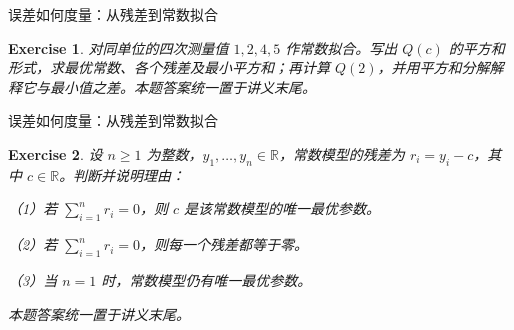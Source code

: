 \documentclass[aspectratio=169,10pt,fontset=fandol]{ctexbeamer}
\newtheorem{exercise}{Exercise}
\begin{document}
\begin{frame}[t,fragile]{误差如何度量：从残差到常数拟合}
\normalsize
{\normalsize
\begin{exercise}
\label{mathagent:exercise:79e91357ee05b8b9aa4c657d553157f1ef411624d282c3f2337dd0e01453ce2d}
对同单位的四次测量值 $1,2,4,5$ 作常数拟合。写出 $Q(c)$ 的平方和形式，求最优常数、各个残差及最小平方和；再计算 $Q(2)$，并用平方和分解解释它与最小值之差。本题答案统一置于讲义末尾。
\end{exercise}
}
\end{frame}
\begin{frame}[t,fragile]{误差如何度量：从残差到常数拟合}
\normalsize
{\normalsize
\begin{exercise}
\label{mathagent:exercise:9e7dbf7ef17df1506f236bbf1ad6ff8c14ff13065df89e12b796d18475228be7}
设 $n\geq1$ 为整数，$y_1,\ldots,y_n\in\mathbb{R}$，常数模型的残差为 $r_i=y_i-c$，其中 $c\in\mathbb{R}$。判断并说明理由：

（1）若 $\sum_{i=1}^{n}r_i=0$，则 $c$ 是该常数模型的唯一最优参数。

（2）若 $\sum_{i=1}^{n}r_i=0$，则每一个残差都等于零。

（3）当 $n=1$ 时，常数模型仍有唯一最优参数。

本题答案统一置于讲义末尾。
\end{exercise}
}
\end{frame}
\end{document}

